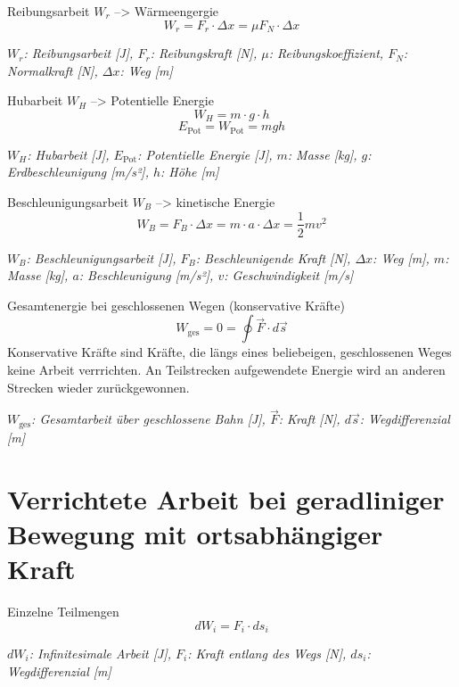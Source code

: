 \documentclass[a4paper,10pt]{article}
\newenvironment{displayformula}
{
	\begin{framed}
		\color{formulaColor}
	}
	{\end{framed}}
\newcommand{\formulalegend}[1]{%
	\par\vspace{0.5ex}%
	{{\color{legendColor}\RaggedRight\small\textit{#1}}}%
	\par\vspace{1.5ex}%
}
\begin{document}
\begin{displayformula}
	Reibungsarbeit \( W_r \) --> Wärmeengergie
	\[
	W_r = F_r \cdot \Delta x = \mu F_N \cdot \Delta x
	\]
\end{displayformula}
\formulalegend{
	\( W_r \): Reibungsarbeit [J], \( F_r \): Reibungskraft [N], \( \mu \): Reibungskoeffizient, \( F_N \): Normalkraft [N], \( \Delta x \): Weg [m]
}

\begin{displayformula}
	Hubarbeit \( W_H \) --> Potentielle Energie
	\[
	W_H = m \cdot g \cdot h
	\]
	\[
	E_{\text{Pot}} = W_{\text{Pot}} = mgh
	\]
\end{displayformula}
\formulalegend{
	\( W_H \): Hubarbeit [J], \( E_{\text{Pot}} \): Potentielle Energie [J], \( m \): Masse [kg], \( g \): Erdbeschleunigung [m/s²], \( h \): Höhe [m]
}

\begin{displayformula}
	Beschleunigungsarbeit \( W_B \) --> kinetische Energie
	\[
	W_B = F_B \cdot \Delta x = m \cdot a \cdot \Delta x = \frac{1}{2} mv^2
	\]
\end{displayformula}
\formulalegend{
	\( W_B \): Beschleunigungsarbeit [J], \( F_B \): Beschleunigende Kraft [N], \( \Delta x \): Weg [m], \( m \): Masse [kg], \( a \): Beschleunigung [m/s²], \( v \): Geschwindigkeit [m/s]
}

\begin{displayformula}
	Gesamtenergie bei geschlossenen Wegen (konservative Kräfte)
	\[
	W_{\text{ges}} = 0 = \oint \vec{F} \cdot d\vec{s}
	\]
	Konservative Kräfte sind Kräfte, die längs eines beliebeigen, geschlossenen Weges keine Arbeit verrrichten. An Teilstrecken aufgewendete Energie wird an anderen Strecken wieder zurückgewonnen.
\end{displayformula}
\formulalegend{
	\( W_{\text{ges}} \): Gesamtarbeit über geschlossene Bahn [J], \( \vec{F} \): Kraft [N], \( d\vec{s} \): Wegdifferenzial [m]
}

\section{Verrichtete Arbeit bei geradliniger Bewegung mit ortsabhängiger Kraft}

\begin{displayformula}
	Einzelne Teilmengen
	\[
	dW_i = F_i \cdot ds_i
	\]
\end{displayformula}
\formulalegend{
	\( dW_i \): Infinitesimale Arbeit [J], \( F_i \): Kraft entlang des Wegs [N], \( ds_i \): Wegdifferenzial [m]
}
\end{document}
